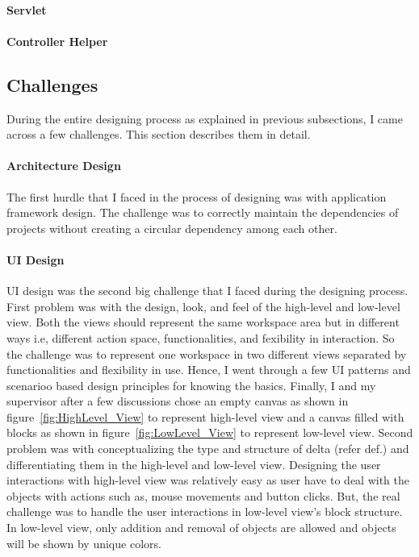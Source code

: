 \paragraph{Servlet}


\paragraph{Controller Helper}

\subsection{Challenges}\label{subsec:designchallenges}
During the entire designing process as explained in previous subsections, I came across a few challenges. This section describes them in detail.

\paragraph{Architecture Design}
The first hurdle that I faced in the process of designing was with application framework design. The challenge was to correctly maintain the dependencies of projects without creating a circular dependency among each other.

\paragraph{UI Design}
UI design was the second big challenge that I faced during the designing process.
\newline\newline First problem was with the design, look, and feel of the high-level and low-level view. Both the views should represent the same workspace area but in different ways i.e, different action space, functionalities, and fexibility in interaction. So the challenge was to represent one workspace in two different views separated by functionalities and flexibility in use. Hence, I went through a few UI patterns \cite{designinterfaces} and scenarioo based design principles \cite{scenariobasedui} for knowing the basics. Finally, I and my supervisor after a few discussions chose an empty canvas as shown in figure~\ref{fig:HighLevel_View} to represent high-level view and a canvas filled with blocks as shown in figure~\ref{fig:LowLevel_View} to represent low-level view.
\newline\newline Second problem was with conceptualizing the type and structure of delta (refer def.) and differentiating them in the high-level and low-level view. 
\newline\newline Designing the user interactions with high-level view was relatively easy as user have to deal with the objects with actions such as, mouse movements and button clicks. But, the real challenge was to handle the user interactions in low-level view's block structure. In low-level view, only addition and removal of objects are allowed and objects will be shown by unique colors. 









